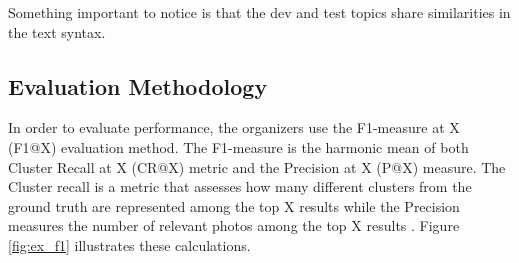     Something important to notice is that the dev and test topics share similarities in the text syntax. 

        \subsection{Evaluation Methodology}
        \label{sec:eval}
        
        
        In order to evaluate performance, the organizers use the F1-measure at X (F1@X) evaluation method. The F1-measure is the harmonic mean of both Cluster Recall at X (CR@X) metric and the Precision at X (P@X) measure. The Cluster recall is a metric that assesses how many different clusters from the ground truth are represented among the top X results  while the Precision measures the number of  relevant photos among the top X results \cite{Ninh2020}. Figure \ref{fig:ex_f1} illustrates these calculations.


